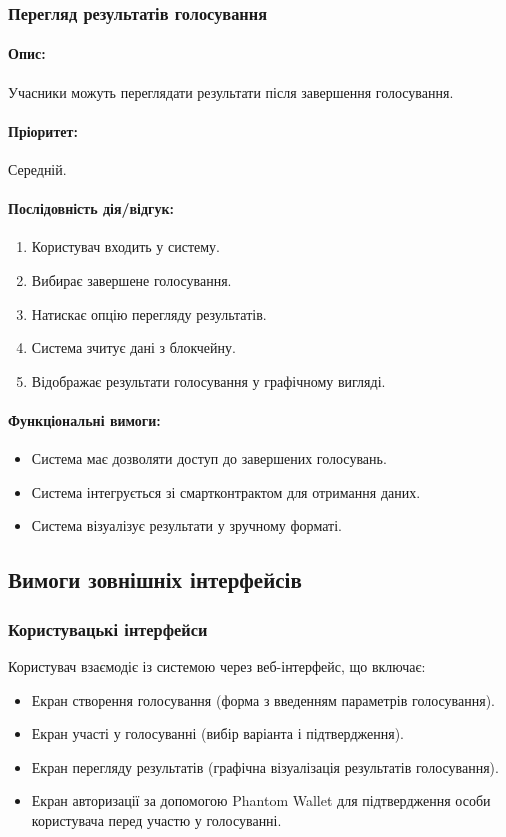 \documentclass[14pt]{extreport}
\newcounter{req}[subsubsection]
\newcommand\req{\arabic{req}\stepcounter{req}}
\begin{document}
  \subsubsection{Перегляд результатів голосування}  
  \paragraph{Опис:} Учасники можуть переглядати результати після завершення голосування.  
  \paragraph{Пріоритет:} Середній.  
  \paragraph{Послідовність дія/відгук:}  
  \begin{enumerate}  
      \item Користувач входить у систему.  
      \item Вибирає завершене голосування.  
      \item Натискає опцію перегляду результатів.  
      \item Система зчитує дані з блокчейну.  
      \item Відображає результати голосування у графічному вигляді.  
  \end{enumerate}  
  \paragraph{Функціональні вимоги:}  
  \begin{itemize}[leftmargin=*,label=REQ-.\req:]  
      \item Система має дозволяти доступ до завершених голосувань.  
      \item Система інтегрується зі смартконтрактом для отримання даних.  
      \item Система візуалізує результати у зручному форматі.  
  \end{itemize}  

  \subsection{Вимоги зовнішніх інтерфейсів}
  \subsubsection{Користувацькі інтерфейси}
  Користувач взаємодіє із системою через веб-інтерфейс, що включає:
  \begin{itemize}
    \item Екран створення голосування (форма з введенням параметрів голосування).
    \item Екран участі у голосуванні (вибір варіанта і підтвердження).
    \item Екран перегляду результатів (графічна візуалізація результатів голосування).
    \item Екран авторизації за допомогою Phantom Wallet для підтвердження особи користувача перед участю у голосуванні.
  \end{itemize}
  
\end{document}

